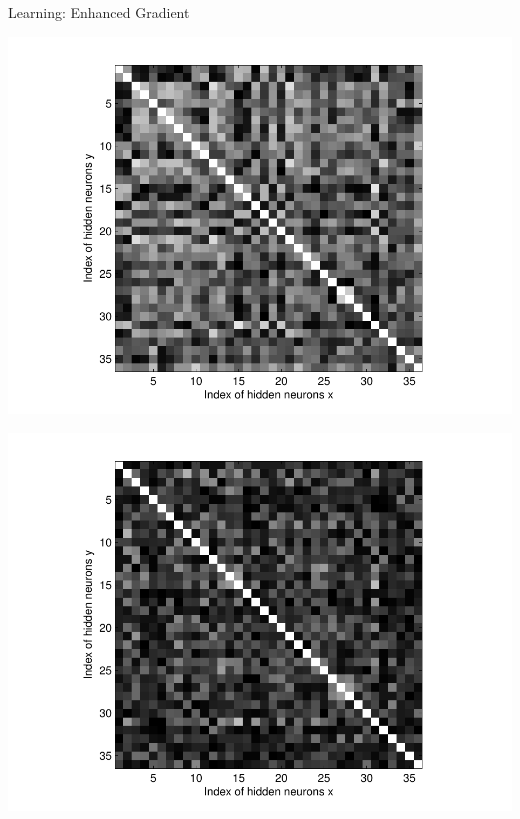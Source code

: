 \documentclass{beamer}
\begin{document}
\begin{frame}{Learning: Enhanced Gradient}
\begin{minipage}{0.35\textwidth}
\begin{minipage}{0.49\columnwidth}
\begin{minipage}{\columnwidth}
\begin{center}
                \end{center}
            \end{minipage}
        \end{minipage}
        \hfill
        \begin{minipage}{0.49\columnwidth}
            \begin{minipage}{\columnwidth}
                \begin{center}
                    \includegraphics[width=\columnwidth,trim=93 35 75 20,clip=true]{norm_grad_cov_later.pdf}
                \end{center}
            \end{minipage}
            \begin{minipage}{\columnwidth}
                \begin{center}
                    \includegraphics[width=\columnwidth,trim=93 35 75 20,clip=true]{enh_grad_cov_later.pdf}

\end{center}
\end{minipage}
\end{minipage}
\end{minipage}
\end{frame}
\end{document}
